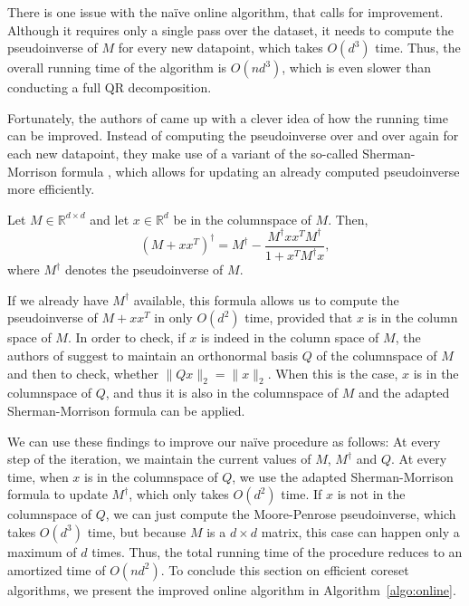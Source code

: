 There is one issue with the na\"ive online algorithm, that calls for
improvement. Although it requires only a single pass over the dataset,
it needs to compute the pseudoinverse of $M$ for every new
datapoint, which takes $O(d^3)$ time. Thus, the overall running time
of the algorithm is $O(nd^3)$, which is even slower than conducting
a full QR decomposition.

Fortunately, the authors of \cite{tensor-factorization} came up
with a clever idea of how the running time can be improved.
Instead of computing the pseudoinverse over and over again for
each new datapoint, they make use of a variant of the so-called
Sherman-Morrison formula \cite{sherman-morrison},
which allows for updating an already
computed pseudoinverse more efficiently.

\begin{lemma}
    Let $M \in \mathbb{R}^{d \times d}$ and let $x \in \mathbb{R}^d$
    be in the columnspace of $M$. Then,
    \begin{equation*}
        (M + xx^T)^\dagger = M^\dagger -
        \frac{M^\dagger x x^T M^\dagger}{1 + x^TM^\dagger x},
    \end{equation*}
    where $M^\dagger$ denotes the pseudoinverse of $M$.
\end{lemma}

If we already have $M^\dagger$ available, this formula allows us
to compute the pseudoinverse of $M + xx^T$ in only $O(d^2)$
time, provided that $x$ is in the column space of $M$.
In order to check, if $x$ is indeed in the
column space of $M$,
the authors of \cite{tensor-factorization}
suggest to maintain an orthonormal basis $Q$ of the columnspace
of $M$ and then to check, whether
$\lVert Qx \rVert_2 = \lVert x \rVert_2$. When this is the case, $x$ is
in the columnspace of $Q$, and thus it is also in the columnspace of
$M$ and the adapted
Sherman-Morrison formula can be applied.

We can use these findings to improve our na\"ive procedure as follows:
At every step of the iteration, we maintain the current values
of $M$, $M^\dagger$ and $Q$. At every time, when $x$ is in the
columnspace of $Q$, we use the adapted Sherman-Morrison
formula to update $M^\dagger$, which only takes $O(d^2)$
time. If $x$ is not in the columnspace of $Q$, we can
just compute the Moore-Penrose pseudoinverse, which takes
$O(d^3)$ time, but because $M$ is a $d \times d$ matrix,
this case can happen only a maximum of $d$ times.
Thus, the total running time of the procedure reduces
to an amortized time of $O(nd^2)$.
To conclude this section on efficient coreset algorithms,
we present the improved online algorithm in
Algorithm~\ref{algo:online}.

